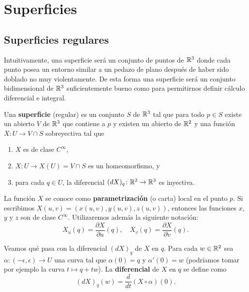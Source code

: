 \part{Superficies}

\chapter{Superficies regulares}

Intuitivamente, una superficie será un conjunto de puntos de $\mathbb{R}^3$ donde cada
punto posea un entorno similar a un pedazo de plano después de haber sido
doblado no muy violentamente.
De esta forma una superficie será un conjunto bidimensional de $\mathbb{R}^3$ suficientemente bueno
como para permitirnos definir cálculo diferencial e integral.

\begin{definition}
	Una \textbf{superficie} (regular) es un conjunto $S$ de $\mathbb{R}^3$ tal que para
	todo $p\in S$ existe un abierto $V$ de $\mathbb{R}^3$ que contiene a $p$ y existen
	un abierto de $\mathbb{R}^2$ y una función $X\colon U\to V\cap S$ sobreyectiva tal
	que
	\begin{enumerate}
		\item $X$ es de clase $C^{\infty}$, 
		\item $X\colon U\to X(U)=V\cap S$ es un homeomorfismo, y
		\item para cada $q\in U$, la diferencial $(dX)_q\colon\mathbb{R}^2\to\mathbb{R}^3$ es inyectiva. 
	\end{enumerate}
\end{definition}
La función $X$ se conoce como \textbf{parametrización} (o carta) local en el
punto $p$. Si escribimos $X(u,v)=(x(u,v),y(u,v),z(u,v))$, entonces las
funciones $x$, $y$ y $z$ son de clase $C^\infty$. Utilizaremos además la siguiente notación:
\[
	X_u(q)=\frac{\partial X}{\partial u}(q),\quad
	X_v(q)=\frac{\partial X}{\partial v}(q).
\]

Veamos qué pasa con la diferencial $(dX)_q$ de $X$ en $q$. Para cada $w\in\mathbb{R}^2$
sea $\alpha\colon (-\epsilon,\epsilon)\to U$ una curva tal que $\alpha(0)=q$ y
$\alpha'(0)=w$ (podríamos tomar por ejemplo la curva $t\mapsto q+tw$). La
\textbf{diferencial} de $X$ en $q$ se define como 
\[
	(dX)_q(w)=\frac{d}{dt}(X\circ\alpha)(0).
\]

